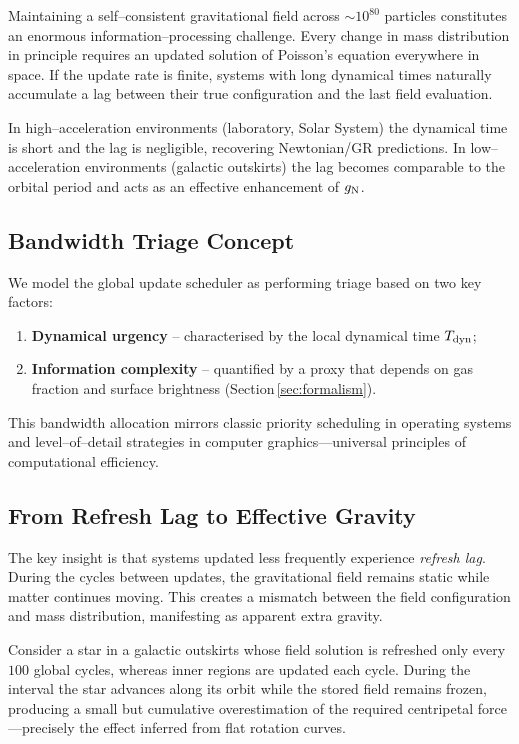 \documentclass[twocolumn,prd,amsmath,amssymb,aps,superscriptaddress,nofootinbib]{revtex4-2}
\begin{document}
Maintaining a self--consistent gravitational field across $\sim10^{80}$
particles constitutes an enormous information--processing challenge.
Every change in mass distribution in principle requires an updated
solution of Poisson's equation everywhere in space.  If the update rate
is finite, systems with long dynamical times naturally accumulate a
lag between their true configuration and the last field evaluation.

In high--acceleration environments (laboratory, Solar System) the
dynamical time is short and the lag is negligible, recovering
Newtonian/GR predictions.  In low--acceleration environments (galactic
outskirts) the lag becomes comparable to the orbital period and acts as
an effective enhancement of $g_{\rm N}$.

\subsection{Bandwidth Triage Concept}

We model the global update scheduler as performing triage based on two
key factors:

\begin{enumerate}
\item \textbf{Dynamical urgency} -- characterised by the local
      dynamical time $T_{\rm dyn}$;
\item \textbf{Information complexity} -- quantified by a proxy that
      depends on gas fraction and surface brightness (Section\,\ref{sec:formalism}).
\end{enumerate}

This bandwidth allocation mirrors classic priority scheduling in
operating systems and level--of--detail strategies in computer
graphics---universal principles of computational efficiency.

\subsection{From Refresh Lag to Effective Gravity}

The key insight is that systems updated less frequently experience \emph{refresh lag}. During the cycles between updates, the gravitational field remains static while matter continues moving. This creates a mismatch between the field configuration and mass distribution, manifesting as apparent extra gravity.

Consider a star in a galactic outskirts whose field solution is
refreshed only every $100$ global cycles, whereas inner regions are
updated each cycle.  During the interval the star advances along its
orbit while the stored field remains frozen, producing a small but
cumulative overestimation of the required centripetal force---precisely
the effect inferred from flat rotation curves.
\end{document}
